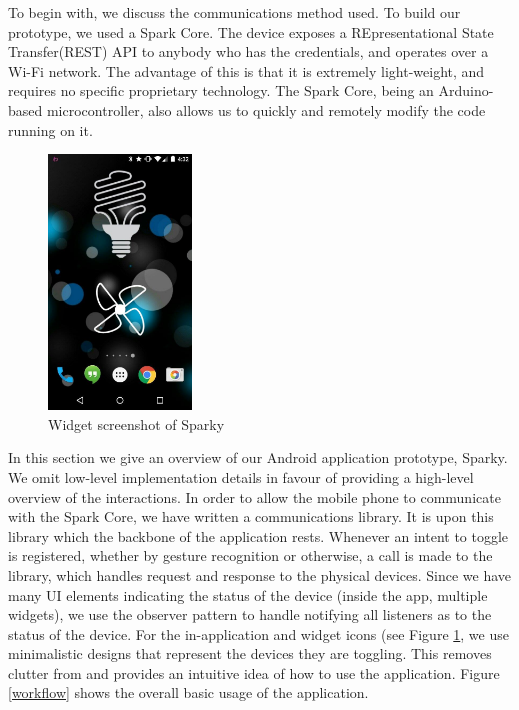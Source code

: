 \documentclass[journal]{IEEEtran}
\begin{document}
To begin with, we discuss the communications method used. To build our prototype, we used a Spark Core. The device exposes a REpresentational State Transfer(REST) API to anybody who has the credentials, and operates over a Wi-Fi network. The advantage of this is that it is extremely light-weight, and requires no specific proprietary technology. The Spark Core, being an Arduino-based microcontroller, also allows us to quickly and remotely modify the code running on it. 
\begin{figure}[!t]
\centering
\includegraphics[width=1.5in]{S3.jpg}
\caption{Widget screenshot of Sparky}
\label{widgetScreenshot}
\end{figure}


In this section we give an overview of our Android application prototype, Sparky. We omit low-level implementation details in favour of providing a high-level overview of the interactions. In order to allow the mobile phone to communicate with the Spark Core, we have written a communications library. It is upon this library which the backbone of the application rests. Whenever an intent to toggle is registered, whether by gesture recognition or otherwise, a call is made to the library, which handles request and response to the physical devices. Since we have many UI elements indicating the status of the device (inside the app, multiple widgets), we use the observer pattern to handle notifying all listeners as to the status of the device. For the in-application and widget icons (see Figure \ref{widgetScreenshot}, we use minimalistic designs that represent the devices they are toggling. This removes clutter from and provides an intuitive idea of how to use the application. Figure \ref{workflow} shows the overall basic usage of the application.
\end{document}
